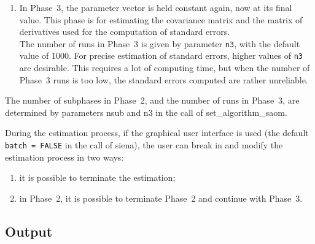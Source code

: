 \documentclass[a4paper,fleqn,11pt]{article}
\newcommand{\+}{\, + \,}
\begin{document}
\begin{enumerate}
      For estimation by Maximum Likelihood, they will usually
      eventually tend to fluctuate about some positive values
      determined by the multiplication factor (see Section~\ref{S_ML}).
      Large quasi-auto\-correlations (larger than .5), when using the Method of
      Maximum Likelihood, suggest that either the estimation process
      is still far from its eventual limit (the final estimate), \underline{or}
      the multiplication factor may be too small.
      But in this case, the auto\-correlations given in the output file
      are more important information than those given on the screen.
\item In Phase~3, the parameter vector is held constant again,
      now at its final value.
      This phase is for estimating the covariance matrix and the
      matrix of derivatives used for the computation of standard errors.\\
      The number of runs in Phase~3 is given by parameter \texttt{n3},
      with the default value of 1000.
      For precise estimation of standard errors, higher values of \texttt{n3}
      are desirable. This requires a lot
      of computing time, but when the number of Phase~3 runs is too low,
      the standard errors computed are rather unreliable.
\end{enumerate}

The number of subphases in Phase~2, and the number of runs in
Phase~3, are determined by parameters \textsf{nsub} and \textsf{n3}
in the call of \textsf{set\_algorithm\_saom}.

During the estimation process, if the graphical user interface
is used (the default \\
\texttt{batch = FALSE} in the call of \textsf{siena}),
the user can break in and modify the estimation process in two
ways:
\begin{enumerate}
\item it is possible to terminate the estimation;
\item in Phase~2, it is possible to terminate Phase~2
      and continue with Phase~3.
\end{enumerate}



\subsection{Output}
\label{S_output}
\end{document}
